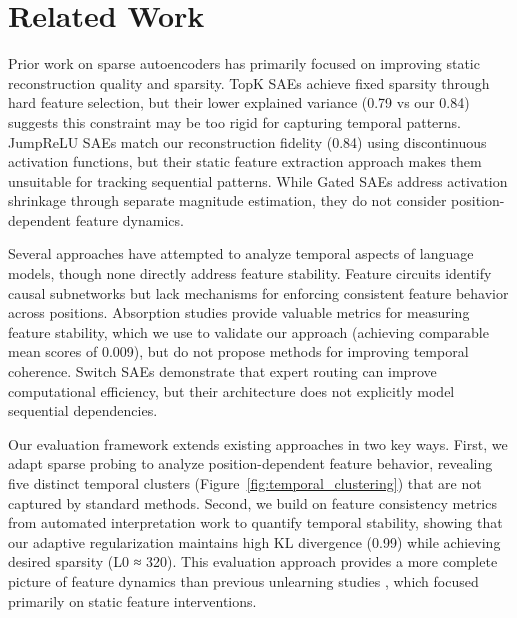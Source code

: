 \documentclass{article} %
\begin{document}
\section{Related Work}
\label{sec:related}

Prior work on sparse autoencoders has primarily focused on improving static reconstruction quality and sparsity. TopK SAEs \cite{bussmannBatchTopKSparseAutoencoders2024} achieve fixed sparsity through hard feature selection, but their lower explained variance (0.79 vs our 0.84) suggests this constraint may be too rigid for capturing temporal patterns. JumpReLU SAEs \cite{rajamanoharanJumpingAheadImproving2024} match our reconstruction fidelity (0.84) using discontinuous activation functions, but their static feature extraction approach makes them unsuitable for tracking sequential patterns. While Gated SAEs \cite{rajamanoharanImprovingDictionaryLearning2024} address activation shrinkage through separate magnitude estimation, they do not consider position-dependent feature dynamics.

Several approaches have attempted to analyze temporal aspects of language models, though none directly address feature stability. Feature circuits \cite{marksSparseFeatureCircuits2024} identify causal subnetworks but lack mechanisms for enforcing consistent feature behavior across positions. Absorption studies \cite{chaninAbsorptionStudyingFeature2024} provide valuable metrics for measuring feature stability, which we use to validate our approach (achieving comparable mean scores of 0.009), but do not propose methods for improving temporal coherence. Switch SAEs \cite{mudideEfficientDictionaryLearning2024a} demonstrate that expert routing can improve computational efficiency, but their architecture does not explicitly model sequential dependencies.

Our evaluation framework extends existing approaches in two key ways. First, we adapt sparse probing \cite{gurneeFindingNeuronsHaystack2023} to analyze position-dependent feature behavior, revealing five distinct temporal clusters (Figure~\ref{fig:temporal_clustering}) that are not captured by standard methods. Second, we build on feature consistency metrics from automated interpretation work \cite{pauloAutomaticallyInterpretingMillions2024} to quantify temporal stability, showing that our adaptive regularization maintains high KL divergence (0.99) while achieving desired sparsity (L0 ≈ 320). This evaluation approach provides a more complete picture of feature dynamics than previous unlearning studies \cite{farrellApplyingSparseAutoencoders2024}, which focused primarily on static feature interventions.
\end{document}
